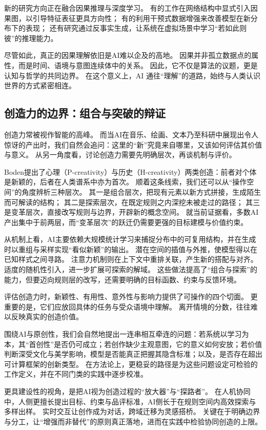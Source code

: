 新的研究方向正在融合因果推理与深度学习。
有的工作在网络结构中显式引入因果图，以引导特征表征更具方向性；
有的利用干预式数据增强来改善模型在新分布下的表现；
还有研究通过反事实生成，让系统在虚拟场景中学习“若如此则彼”的推理能力。

尽管如此，真正的因果理解依旧是AI难以企及的高地。
因果并非孤立数据点的属性，而是时间、语境与意图连续体中的关系。
因此，它不仅是算法的议题，更是认知与哲学的共同边界。
在这个意义上，AI 通往“理解”的道路，始终与人类认识世界的方式紧密相连。

\subsection{创造力的边界：组合与突破的辩证}

创造力常被视作智能的高峰。
而当AI在音乐、绘画、文本乃至科研中展现出令人惊讶的产出时，我们自然会追问：这里的“新”究竟来自哪里，又该如何评估其价值与意义。
从另一角度看，讨论创造力需要先明确层次，再谈机制与评价。

Boden提出了心理（P-creativity）与历史（H-creativity）两类创造：前者对个体是新颖的，后者在人类谱系中亦为首次。
顺着这条线索，我们还可以从“操作空间”的角度辨析三种层次。
其一是组合层次，把现有元素以新方式拼接，生成陌生而可解读的结构；
其二是探索层次，在既定规则之内深挖未被走过的路径；
其三是变革层次，直接改写规则与边界，开辟新的概念空间。
就当前证据看，多数AI产出集中于前两层，而“变革层次”的跃迁仍需要更强的目标建模与价值约束。

从机制上看，AI主要依赖大规模统计学习来捕捉分布中的可复用结构，并在生成时以重组与采样实现“看似新颖”的输出。
潜在空间的插值与外推，使模型得以在已知样式之间寻路。
注意力机制则在上下文中重排关联，产生新的搭配与对齐。
适度的随机性引入，进一步扩展可探索的解域。
这些做法提高了“组合与探索”的能力，但要迈向规则层的改写，还需要明确的目标函数、约束与反馈环境。

评估创造力时，新颖性、有用性、意外性与影响力提供了可操作的四个切面。
更重要的是，它们应放回具体的任务与受众语境中理解。
离开情境的分数，往往难以反映真实的创造价值。

围绕AI与原创性，我们会自然地提出一连串相互牵连的问题：若系统以学习为本，其“首创性”是否仍可成立；若创作缺少主观意图，它的意义如何安放；若价值判断深受文化与美学影响，模型是否能真正把握其隐含标准；以及，是否存在超出可计算框架的创新类型。
在方法论上，更稳妥的路径是为这些问题设定可检验的工作定义，并在不同门类的实践中逐步校准。

更具建设性的视角，是把AI视为创造过程的“放大器”与“探路者”。
在人机协同中，人侧更擅长提出目标、约束与品评标准，AI侧长于在规则空间内高效探索与多样出样。
实时交互让创作成为对话，跨域迁移为灵感搭桥。
关键在于明确边界与分工，让“增强而非替代”的原则真正落地，进而在实践中检验协同创造的上限。

